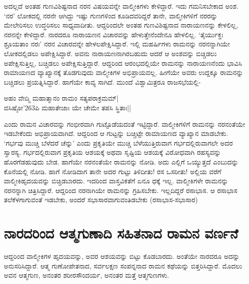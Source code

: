 ಅದಲ್ಲದೆ ಅಂತಹ ಗುಣವಿಶಿಷ್ಟನಾದ ನರನ ವಿಷಯವನ್ನೇ ವಾಲ್ಮೀಕಿಗಳು ಕೇಳಿದ್ದಾರೆ. ಇದು ಗಮನಿಸಬೇಕಾದ ಅಂಶ. `ನರ' ಲೋಕದಲ್ಲಿ ನರನೇ ಆಗಿದ್ದು ಇಷ್ಟು ಗುಣಗಳಿಂದ ಕೂಡಿದವರಿದ್ದರೆ ತಾನೇ, ವಾಲ್ಮೀಕಿಗಳಿಗೆ ನರರನ್ನು ಮೇಲೇರಿಸಲು ಉದ್ಧರಿಸಲು ಸಾಧ್ಯವಾದೀತು. ಆದ್ದರಿಂದಲೇ ಅಂತಹ ಗುಣವಿಶಿಷ್ಟನಾದ ನಾರಾಯಣನನ್ನು ಕೇಳಲಿಲ್ಲ, ನರನನ್ನೇ ಕೇಳಿದ್ದಾರೆ. ನಾರದರೂ ನಾರಾಯಣನ ವಿಚಾರವನ್ನು ಹೇಳುತ್ತೇನೆಂದೇನೂ ಹೇಳಲಿಲ್ಲ. `ತೈರ್ಯುಕ್ತಃ ಶ್ರೂಯತಾಂ ನರಃ' ನರನ ವಿಚಾರವನ್ನೇ ಹೇಳಲಪೇಕ್ಷಿಸಿದ್ದಾರೆ. ಇಲ್ಲಿ ಮಹರ್ಷಿಗಳು ರಾಮನನ್ನು ನರನನ್ನಾಗಿಯೇ ಲೋಕದಲ್ಲಿಡಲು ಅಪೇಕ್ಷಿಸಿದ್ದಾರೆ. ಅವನು ನಾರಾಯಣನಾಗಿರಬಹುದು ಆದರೆ ಆ ಅಂಶವನ್ನು ಬಿಚ್ಚಿಡಲು ಅಪೇಕ್ಷಿಸುತ್ತಿಲ್ಲ, ಬಚ್ಚಿಡಲು ಅಪೇಕ್ಷಿಸುತ್ತಿದ್ದಾರೆ. ಆದ್ದರಿಂದ ಆರಂಭದಲ್ಲಿಯೇ ರಾಮನನ್ನು ನಾರಾಯಣನೆಂದು ಭಾವಿಸಿ ರಾಮಾಯಣದ ವ್ಯಾಖ್ಯಾನಕ್ಕೆ ತೊಡಗುವುದು ವಾಲ್ಮೀಕಿಗಳ ಅಭಿಪ್ರಾಯವಲ್ಲ. ಹೀಗೆಯೇ ಅವರು ಉದ್ದಕ್ಕೂ ರಾಮನನ್ನು ಬಚ್ಚಿಡಲು ಪ್ರಯತ್ನಿಸಿದ್ದಾರೆ. ಹಾಗೆಯೇ ಕಾವ್ಯ ಸಾಗಿದೆ. ಮುಂದೆ ವಿಶ್ವಾಮಿತ್ರರೂ ರಾಜಸಭೆಯಲ್ಲಿ- 

\begin{shloka} 
ಅಹಂ ವೇದ್ಮಿ ಮಹಾತ್ಮಾನಂ ರಾಮಂ ಸತ್ಯಪರಾಕ್ರಮಮ್‍|\label{195}\\ 
ವಸಿಷ್ಠೋ\char'263ಪಿ ಮಹಾತೇಜಾಃ ಯೇ ಚೇಮೇ ತಪಸಿ ಸ್ಥಿತಾಃ||
\end{shloka}
ಎಂದು ರಾಮನ ವಿಚಾರವನ್ನು ಗಂಭೀರವಾಗಿ ಗುಟ್ಟೊಡೆಯದಂತೆ ಇಟ್ಟಿದ್ದಾರೆ. ವಾಲ್ಮೀಕಿಗಳಿಗೆ ರಾಮನನ್ನು ನರನಂತೆಯೇ ಇಡಬೇಕೆಂದು ಅಭಿಪ್ರಾಯವಾಗಿದೆ. ಆದ್ದರಿಂದ ಆ ಗುಟ್ಟನ್ನು ಬಚ್ಚಿಟ್ಟೇ ರಾಮಾಯಣದ ವ್ಯಾಖ್ಯಾನ ಮಾಡಬೇಕು. `ಗರ್ಭವು ಮುಚ್ಚಿ ಬೆಳೆದರೆ ಚೆನ್ನು' ಎಂದು ಪ್ರಕೃತಿಯೇ ಮುಚ್ಚಿ ಬೆಳೆಯುತ್ತಿರುವಾಗ ಗರ್ಭದಲ್ಲಿರುವಾಗಲೇ ಅದರ ಸ್ವಾರಸ್ಯ. ಗರ್ಭದಲ್ಲಿರುವಾಗ ಪ್ರಕೃತಿಯ ಆಶಯಕ್ಕೆ ಅಥವಾ ಸೃಷ್ಟಿಯ ಆಶಯಕ್ಕೆ ವಿರೋಧವಾಗಿ ರಹಸ್ಯವನ್ನು ಹೊರಗೆಡಹುವುದು ಬೇಡ. ಹಾಗೆಯೇ ನರನಂತೆಯೇ ರಾಮನನ್ನು ನೋಡಿ. ಅದು ಎಲ್ಲಿಗೆ ಒಯ್ಯುತ್ತದೆ ಎಂಬುದನ್ನು ಕೊನೆಯಲ್ಲಿ ನೋಡಿ. ಹಾಗೆ ನೋಡಿದಾಗ ತಾನೇ ಅದರ ಗುಟ್ಟು ತಿಳಿದೀತು! ರಸ ಒಸರೀತು! ಅಲ್ಲಿಯ ವರೆಗೆ ವಾಲ್ಮೀಕಿಹೃದಯವನ್ನು ಬಿಚ್ಚಿಡಬಾರದು. ಇದರಿಂದ ವಾಸ್ತವಿಕತೆಗೆ ಏನೂ ಧಕ್ಕೆ ಇಲ್ಲ. ವಾಲ್ಮೀಕಿಗಳೇ ರಾಮನನ್ನು ನರನನ್ನಾಗಿ ಚಿತ್ರಿಸಿದ್ದಾರೆ. ಆದ್ದರಿಂದ ನರನಾಗಿಯೇ ರಾಮನನ್ನು ಗ್ರಹಿಸಬೇಕು. ಇಲ್ಲದಿದ್ದರೆ ರಸಾಭಾಸ. ಆ ರಸಾಭಾಸ ತಲೆಕೆಳಗಾಗುವಂತೆ ಇಡಬೇಕು, ಅಂದರೆ ಸಭಾಸಾರವಾಗುವಂತಿಡಬೇಕು (ರಸಾಭಾಸ-ಸಭಾಸಾರ) 

\section*{ನಾರದರಿಂದ ಆತ್ಮಗುಣಾದಿ ಸಹಿತನಾದ ರಾಮನ ವರ್ಣನೆ} 

ಆದ್ದರಿಂದ ವಾಲ್ಮೀಕಿಗಳ ಹೃದಯವನ್ನು, ಅವರ ಆಶಯವನ್ನು ಬಿಟ್ಟು ಕೊಡಬಾರದು. ಅಂತೆಯೇ ನಾರದರೂ ಅದನ್ನು ಅನುಸರಿಸಿದ್ದಾರೆ. ಆತ್ಮ ಗುಣೋಪೇತನಾದ, ಸರ್ವಲಕ್ಷಣ ಸಂಪನ್ನನಾದ ರಾಮನ ಕಥೆಯನ್ನು ಬಿತ್ತರಿಸಿದ್ದಾರೆ. ಮೊದಲು ಅವನ ಆತ್ಮಗುಣ, ಅನಂತರ ಶರೀರಸೌಂದರ್ಯ, ಅನಂತರ ಮತ್ತೆ ಆತ್ಮಗುಣಗಳು. 

